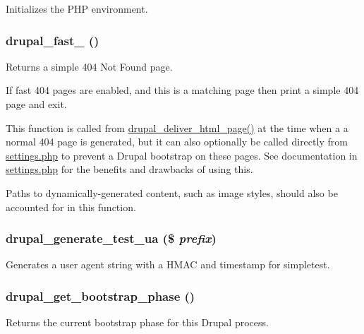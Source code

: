 \label{bootstrap_8inc_a14319f2e33c7996576b203ed2bae9b62}
Initializes the PHP environment. \hypertarget{bootstrap_8inc_a1b7e5fe865e978d10be87d3eb57e42f7}{
\subsubsection[{drupal\_\-fast\_\-404}]{\setlength{\rightskip}{0pt plus 5cm}drupal\_\-fast\_ ()}}
\label{bootstrap_8inc_a1b7e5fe865e978d10be87d3eb57e42f7}
Returns a simple 404 Not Found page.

If fast 404 pages are enabled, and this is a matching page then print a simple 404 page and exit.

This function is called from \hyperlink{common_8inc_a05ab0d6e81d6cbe2a6b9f645b9e710ec}{drupal\_\-deliver\_\-html\_\-page()} at the time when a a normal 404 page is generated, but it can also optionally be called directly from \hyperlink{settings_8php}{settings.php} to prevent a Drupal bootstrap on these pages. See documentation in \hyperlink{settings_8php}{settings.php} for the benefits and drawbacks of using this.

Paths to dynamically-\/generated content, such as image styles, should also be accounted for in this function. \hypertarget{bootstrap_8inc_a58a494e2753af5f55a59dae53ceab3ac}{
\subsubsection[{drupal\_\-generate\_\-test\_\-ua}]{\setlength{\rightskip}{0pt plus 5cm}drupal\_\-generate\_\-test\_\-ua (\$ {\em prefix})}}
\label{bootstrap_8inc_a58a494e2753af5f55a59dae53ceab3ac}
Generates a user agent string with a HMAC and timestamp for simpletest. \hypertarget{bootstrap_8inc_aef1090e39844ccfc688f9b93fd048d8d}{
\subsubsection[{drupal\_\-get\_\-bootstrap\_\-phase}]{\setlength{\rightskip}{0pt plus 5cm}drupal\_\-get\_\-bootstrap\_\-phase ()}}
\label{bootstrap_8inc_aef1090e39844ccfc688f9b93fd048d8d}
Returns the current bootstrap phase for this Drupal process.

